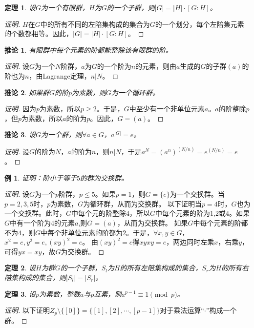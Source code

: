 \documentclass{article}
\newtheorem{Thm}{定理}
\newtheorem*{Example}{例}
\newtheorem{Cor}{推论}
\begin{document}
\begin{CJK*}{UTF8}{gbsn}
\begin{Thm}
 设$G$为一个有限群，$H$为$G$的一个子群，则$|G|=|H|\cdot [G:H]$。 
\end{Thm}
\begin{proof}[证明]
  $H$在$G$中的所有不同的左陪集构成的集合为$G$的一个划分，每个左陪集元素的个数都相等。因此，$|G|=|H|\cdot [G:H]$。
\end{proof}
\begin{Cor}
有限群中每个元素的阶都能整除该有限群的阶。
\end{Cor}
\begin{proof}[证明]
  设$G$为一个$N$阶群，$a$为$G$的一个阶为$n$的元素，则由$a$生成的$G$的子群$(a)$的阶也为$n$，由Lagrange定理，$n|N$。
\end{proof}
\begin{Cor}
  如果群$G$的阶$p$为素数，则$G$为一个循环群。
\end{Cor}
\begin{proof}[证明]
因为$p$为素数，所以$p\geq 2$。于是，$G$中至少有一个非单位元素$a$。$a$的阶整除$p$，但$p$为素数，所以$a$的阶为$p$。因此，$G=(a)$。
\end{proof}
\begin{Cor}
  设$G$为一个群，则$\forall a\in G$，$a^{|G|}=e$。
\end{Cor}
\begin{proof}[证明]
  设$G$的阶为$N$，$a$的阶为$n$，则$n|N$，于是$a^N=(a^n)^{(N/n)}=e^{(N/n)}=e$。
\end{proof}
\begin{Example}
  证明：阶小于等于$5$的群为交换群。
\end{Example}
\begin{proof}[证明]
  设$G$为一个$p$阶群，$p\leq 5$。如果$p=1$，则$G=\{e\}$为一个交换群。当$p=2,3,5$时，$p$为素数，$G$为循环群，从而为交换群。
  以下证明当$p=4$时，$G$也为一个交换群。此时，$G$中每个元的阶整除$4$，所以$G$中每个元素的阶为$1$,$2$或$4$。如果$G$中有一个阶为$4$的元素$a$,则$G=(a)$，从而为交换群。
  如果$G$中每个元素的阶都不为$4$，则$G$中每个非单位元素的阶都为$2$。于是，$\forall x,y\in G$，$x^2=e,y^2=e,(xy)^2=e$。
  由$(xy)^2=e$得$xyxy=e$，两边同时左乘$x$，右乘$y$，可得$yx=xy$，故$G$为交换群。

\end{proof}
\begin{Thm}
  设$H$为群$G$的一个子群，$S_l$为$H$的所有左陪集构成的集合，$S_r$为$H$的所有右陪集构成的集合，则$|S_l|=|S_r|$。
\end{Thm}

\begin{Thm}
  设$p$为素数，整数$a$与$p$互素，则$a^{p-1}\equiv 1 \pmod p$。
\end{Thm}
\begin{proof}[证明]
  以下证明$Z_p\setminus \{[0]\}=\{[1],[2],\cdots,[p-1]\}$对于乘法运算“$\cdot$”构成一个群。


\end{proof}
\end{CJK*}
\end{document}
